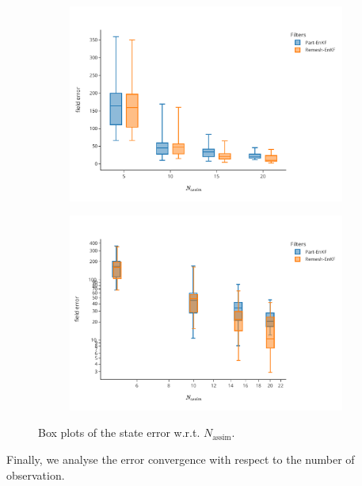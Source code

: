 \begin{figure}[h!]
	\centering
	\begin{subfigure}{0.49\linewidth}
		\includegraphics[width=\linewidth]{./images/app2d/final/MSE_na_box.pdf}
		\caption{}
		\label{fig:na_1}

	\end{subfigure}
	\begin{subfigure}{0.49\linewidth}
		\includegraphics[width=\linewidth]{./images/app2d/final/MSE_na_box_log_log.pdf}
		\caption{}
		\label{fig:na_2}
	\end{subfigure}
	\caption{Box plots of the state error w.r.t. $N_{\text{assim}}$.}
	\label{fig:na}

\end{figure}

Finally, we analyse the error convergence with respect to the number of observation.


